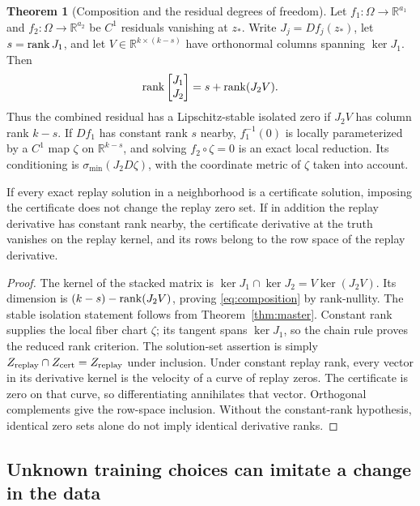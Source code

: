 \documentclass[11pt,a4paper]{article}
\theoremstyle{definition}
\newtheorem{theorem}{Theorem}[section]
\theoremstyle{definition}
\theoremstyle{remark}\newtheorem{remark}[theorem]{Remark}
\newcommand{\R}{\mathbb R}\newcommand{\Prob}{\mathbb P}\newcommand{\E}{\mathbb E}
\newcommand{\smin}{\sigma_{\min}}\newcommand{\smax}{\sigma_{\max}}
\begin{document}
\begin{theorem}[Composition and the residual degrees of freedom]\label{thm:compose}
Let $f_1:\Omega\to\R^{a_1}$ and $f_2:\Omega\to\R^{a_2}$ be $C^1$ residuals vanishing at $z_*$. Write $J_j=Df_j(z_*)$, let $s=\operatorname{rank} J_1$, and let $V\in\R^{k\times(k-s)}$ have orthonormal columns spanning $\ker J_1$. Then
\begin{equation}\label{eq:composition}
\operatorname{rank}\begin{bmatrix}J_1\\J_2\end{bmatrix}
=s+\operatorname{rank}(J_2V).
\end{equation}
Thus the combined residual has a Lipschitz-stable isolated zero if $J_2V$ has column rank $k-s$. If $Df_1$ has constant rank $s$ nearby, $f_1^{-1}(0)$ is locally parameterized by a $C^1$ map $\zeta$ on $\R^{k-s}$, and solving $f_2\circ\zeta=0$ is an exact local reduction. Its conditioning is $\smin(J_2D\zeta)$, with the coordinate metric of $\zeta$ taken into account.

If every exact replay solution in a neighborhood is a certificate solution, imposing the certificate does not change the replay zero set. If in addition the replay derivative has constant rank nearby, the certificate derivative at the truth vanishes on the replay kernel, and its rows belong to the row space of the replay derivative.
\end{theorem}
\begin{proof}
The kernel of the stacked matrix is $\ker J_1\cap\ker J_2=V\ker(J_2V)$. Its dimension is $(k-s)-\operatorname{rank}(J_2V)$, proving \eqref{eq:composition} by rank-nullity. The stable isolation statement follows from Theorem~\ref{thm:master}. Constant rank supplies the local fiber chart $\zeta$; its tangent spans $\ker J_1$, so the chain rule proves the reduced rank criterion. The solution-set assertion is simply $Z_{\rm replay}\cap Z_{\rm cert}=Z_{\rm replay}$ under inclusion. Under constant replay rank, every vector in its derivative kernel is the velocity of a curve of replay zeros. The certificate is zero on that curve, so differentiating annihilates that vector. Orthogonal complements give the row-space inclusion. Without the constant-rank hypothesis, identical zero sets alone do not imply identical derivative ranks.
\end{proof}

\subsection{Unknown training choices can imitate a change in the data}
\end{document}
